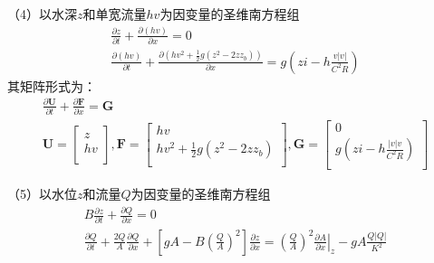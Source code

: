 （4）以水深$z$和单宽流量$hv$为因变量的圣维南方程组
\begin{equation}
  \begin{gathered}
    \frac{\partial z}{\partial t}
    +
    \frac{\partial (hv)}{\partial x}
    =
    0
    \\
    \frac{\partial (hv)}{\partial t}
    +
    \frac{\partial \left(hv^{2} + \frac{1}{2}g(z^{2}-2zz_{b})\right)}{\partial x}
    =
    g
    \left(
    zi-h\frac{v|v|}{C^{2}R}
    \right)
  \end{gathered}
  \label{EqCGe_SV_zq_rect_conser}
\end{equation}
其矩阵形式为：
\begin{equation}
  \begin{gathered}
\frac{\partial \mathbf{U}}{\partial t} +
\frac{\partial \mathbf{F}}{\partial x} =
\mathbf{G}
\\
  \mathbf{U} =
  \begin{bmatrix}
    z \\
    hv \\
  \end{bmatrix}
  ,
  \mathbf{F} =
  \begin{bmatrix}
    hv \\
    hv^{2}+\frac{1}{2}g(z^{2}-2zz_{b}) \\
  \end{bmatrix}
  ,
  \mathbf{G} =
  \begin{bmatrix}
    0 \\
    g(zi - h\frac{|v|v}{C^{2}R}) \\
  \end{bmatrix}
\end{gathered}
  \label{EqCGe_SV_zq_rect_conser_matrix}
\end{equation}

（5）以水位$z$和流量$Q$为因变量的圣维南方程组
\begin{equation}
  \begin{gathered}
    B\frac{\partial z}{\partial t}
    +
    \frac{\partial Q}{\partial x}
    =
    0
    \\
    \frac{\partial Q}{\partial t}
    +
    \frac{2Q}{A}\frac{\partial Q}{\partial x}
    +
    \left[
      gA -
      B
      \left(
      \frac{Q}{A}
      \right)^{2}
    \right]
    \frac{\partial z}{\partial x}
    =
    \left(
    \frac{Q}{A}
    \right)^{2}
    \left.
    \frac{\partial A}{\partial x}
    \right|_{z}
    -
    gA\frac{Q|Q|}{K^{2}}
  \end{gathered}
  \label{EqCGe_SV_zQ}
\end{equation}

